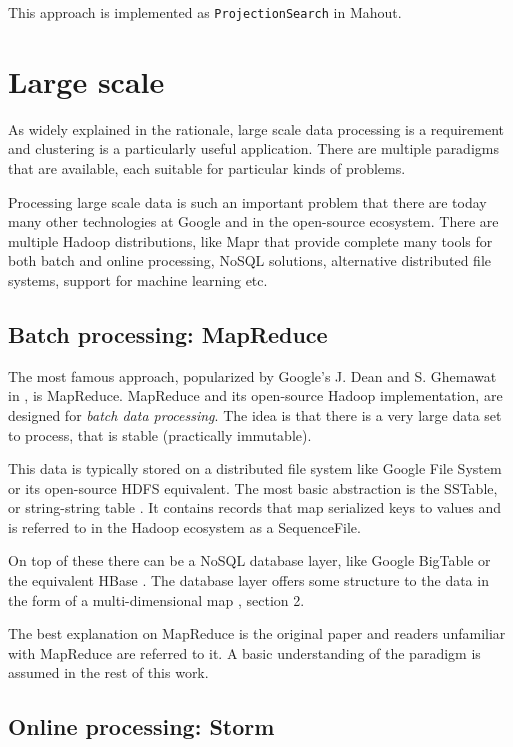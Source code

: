 \documentclass{article}
\begin{document}
This approach is implemented as \texttt{ProjectionSearch} in Mahout.

\section{Large scale}

As widely explained in the rationale, large scale data processing is a
requirement and clustering is a particularly useful application.
There are multiple paradigms that are available, each suitable for particular
kinds of problems.

Processing large scale data is such an important problem that there are today
many other technologies at Google and in the open-source ecosystem. There are
multiple Hadoop distributions, like Mapr \cite{mapr} that provide complete many
tools for both batch and online processing, NoSQL solutions, alternative
distributed file systems, support for machine learning etc.

\subsection{Batch processing: MapReduce}

The most famous approach, popularized by Google's J. Dean and S. Ghemawat in
\cite{mr1}, is MapReduce.
MapReduce and its open-source Hadoop implementation, \cite{hadoop} are designed
for \textit{batch data processing}. The idea is that there is a very large data set
to process, that is stable (practically immutable).

This data is typically stored on a distributed file system like Google File System
\cite{gfs} or its open-source HDFS \cite{hdfs} equivalent.
The most basic abstraction is the SSTable, or string-string table \cite{gfs}.
It contains records that map serialized keys to values and is referred to in
the Hadoop ecosystem as a SequenceFile.

On top of these there can be a NoSQL database layer, like Google BigTable \cite{bt}
or the equivalent HBase \cite{hbase}. The database layer offers some structure
to the data in the form of a multi-dimensional map \cite{bt}, section 2.

The best explanation on MapReduce is the original paper \cite{mr1} and readers
unfamiliar with MapReduce are referred to it. A basic understanding of the
paradigm is assumed in the rest of this work.

\subsection{Online processing: Storm}
\end{document}
